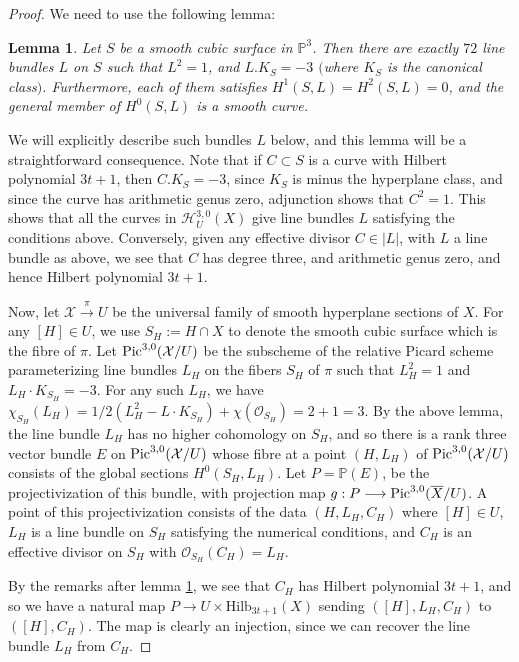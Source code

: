 \documentclass[twoside,12pt,reqno]{amsart}
\theoremstyle{plain}
\newtheorem{lem}[thm]{Lemma}
\theoremstyle{definition}
\newcommand{\PP}{\mathbb{P}}
\newcommand{\Hi}[1]{\text{Hilb}_{#1}}
\def\pic{{\rm Pic}}
\def\ps{\vspace{4pt}}
\newcommand{\OO}{\mathcal O}
\renewcommand{\xrightarrow}[1]{\mathbin{\stackrel{#1}{\longrightarrow}}}
\begin{document}
\begin{proof}

We need to use the following lemma:

\begin{lem}\label{lem-cubicsurf}
Let $S$ be a smooth cubic surface in $\PP^3$. Then there are exactly $72$
line bundles $L$ on $S$ such that $L^2=1$, and $L.K_S=-3$ 
$($where $K_S$ is the canonical class$)$.  Furthermore, each of them
satisfies $H^1(S,L)=H^2(S,L)=0$, and the general member of $H^0(S,L)$ is
a smooth curve.
\end{lem}

We will explicitly describe such bundles $L$ below, and this lemma
will be a straightforward consequence.  Note that if $C\subset S$ is a curve
with Hilbert polynomial $3t+1$, then $C.K_S=-3$, since $K_S$ is 
minus the hyperplane class, and since the curve has arithmetic genus zero,
adjunction shows that $C^2=1$. This shows that all the curves 
in $\mathcal{H}_U^{3,0}(X)$ give line bundles $L$ satisfying the conditions 
above.  Conversely, given any effective divisor $C\in |L|$, with $L$ a line
bundle as above, we see that $C$ has degree three, and arithmetic genus zero,
and hence Hilbert polynomial $3t+1$.

\ps

Now, let $\mathcal{X}\xrightarrow{\pi} U$ be the universal family of smooth
hyperplane sections of $X$.  For any $[H]\in U$, we use $S_H:=H\cap X$ to denote
the smooth cubic surface which is the fibre of $\pi$. Let 
$\pic^{3,0}(\mathcal{X}/U)$ be the subscheme of the relative Picard scheme 
parameterizing line bundles $L_H$ on the fibers $S_H$ of $\pi$ such that
$L_H^2=1$ and $L_H\cdot K_{S_H}=-3$.  For any such $L_H$, we have
$\chi_{S_H}(L_H)=1/2(L_H^2-L\cdot K_{S_H})+\chi(\OO_{S_H})=2+1=3$.
By the above lemma, the line bundle $L_H$ has no higher cohomology on $S_H$,
and so there is a rank three vector bundle $E$ on $\pic^{3,0}(\mathcal{X}/U)$
whose fibre at a point $(H,L_H)$ of $\pic^{3,0}(\mathcal{X}/U)$ consists of
the global sections $H^0(S_H,L_H)$. Let $P=\PP(E)$, be the projectivization
of this bundle, with projection map 
$g:P\longrightarrow \pic^{3,0}(\overline{X}/U)$.  
A point of this projectivization consists of the data $(H,L_H,C_H)$ where
$[H]\in U$, $L_H$ is a line bundle on $S_H$ satisfying the numerical conditions,
and $C_H$ is an effective divisor on $S_H$ with $\OO_{S_H}(C_H)=L_H$.  

\ps
By the remarks after lemma \ref{lem-cubicsurf}, we see that $C_H$ has 
Hilbert polynomial
$3t+1$, and so we have a natural map $P\longrightarrow U\times \Hi{3t+1}(X)$
sending $([H],L_H,C_H)$ to $([H],C_H)$.  The map is clearly an injection,
since we can recover the line bundle $L_H$ from $C_H$.  


\end{proof}
\end{document}

